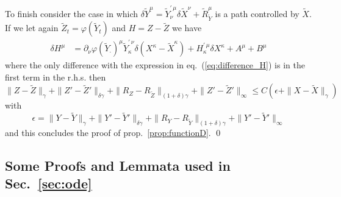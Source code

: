 \documentclass[a4paper,12pt,reqno]{amsproc}
\newcommand{\der}{\delta\!}
\begin{document}
To finish consider the case in which
 $\der\widetilde Y^\mu =  \widetilde Y^{\prime\,\mu}_{\nu}  \der
 \widetilde X^\nu
+ \widetilde  R^\mu_{\widetilde Y}$ is a path controlled by $\widetilde X$. If we let again
$\widetilde Z_t =
\varphi(\widetilde Y_t)$ and $H = Z -\widetilde Z$ we have 
\begin{equation*}
  \begin{split}
\der H^\mu &  =  \partial_\nu \varphi(\widetilde Y_\cdot)^\mu
\widetilde Y^{\prime\,\nu}_\kappa \der (X^\kappa - \widetilde X^\kappa )   +H^{\prime\,\mu}_{\kappa} \der X^\kappa + A^\mu + B^\mu
  \end{split}
\end{equation*}
where the only difference with the expression in
eq.~(\ref{eq:difference_H}) is in the first term in the r.h.s.
then
\begin{equation*}
  \|Z-\widetilde Z\|_\gamma +  \|Z'-\widetilde Z'\|_{\delta\gamma}
+ \|R_Z-R_{\widetilde Z}\|_{(1+\delta)\gamma} + \|Z'-\widetilde Z'\|_{\infty} \le C
(\epsilon+\|X-\widetilde X\|_\gamma)
\end{equation*}
with 
$$
\epsilon =   \|Y-\widetilde Y\|_\gamma +  \|Y'-\widetilde Y'\|_{\delta\gamma}
+ \|R_Y-R_{\widetilde Y}\|_{(1+\delta)\gamma} + \|Y'-\widetilde Y'\|_{\infty}
$$
and this concludes the proof of prop.~\ref{prop:functionD}.
\qed



\subsection{Some Proofs and Lemmata used in Sec.~\ref{sec:ode}}
\end{document}
